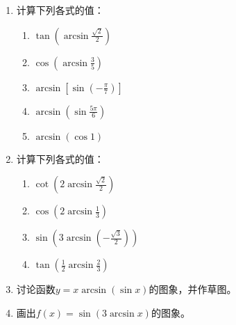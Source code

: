 \begin{enumerate}
\item 计算下列各式的值：
\begin{multicols}{2}
    \begin{enumerate}
        \item $\tan\left(\arcsin\frac{\sqrt{2}}{2}\right)$
        \item $\cos\left(\arcsin \frac{3}{5}\right)$
        \item $\arcsin \left[\sin\left(-\frac{\pi}{7}\right)\right]$
        \item $\arcsin\left(\sin\frac{5\pi}{6}\right)$
        \item $\arcsin(\cos1)$
    \end{enumerate}
    \end{multicols}
    \item 计算下列各式的值：
\begin{multicols}{2}
    \begin{enumerate}
        \item $\cot\left(2\arcsin\frac{\sqrt{2}}{2}\right)$
        \item $\cos\left(2\arcsin\frac{1}{3}\right)$
        \item $\sin\left(3\arcsin\left(-\frac{\sqrt{3}}{2}\right)\right)$
        \item $\tan\left(\frac{1}{2}\arcsin\frac{2}{3}\right)$
    \end{enumerate}
    \end{multicols}

    \item 讨论函数$y=x \arcsin(\sin x)$的图象，并作草图。
\item 画出$f(x)=\sin(3\arcsin x)$的图象。
\end{enumerate}






































